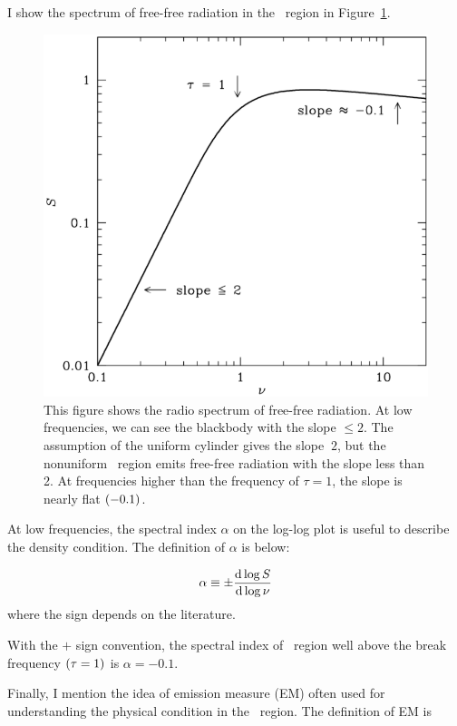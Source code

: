 I show the spectrum of free-free radiation in the \ih~region in Figure~\ref{fig:nrao_radio4n8}.

\begin{figure}[htbp]
	\centering
	\includegraphics[width=.7\linewidth]{Chapter_2/Figures/NRAO_radio4n8.png}
    \caption[The spectrum of free-free radiation]{\label{fig:nrao_radio4n8}
        This figure shows the radio spectrum of free-free radiation.
        At low frequencies, we can see the blackbody with the slope $\leq 2$.
        The assumption of the uniform cylinder gives the slope $~2$, but the nonuniform \ih~region emits free-free radiation with the slope less than 2.
        At frequencies higher than the frequency of $\tau=1$, the slope is nearly flat $\left(-0.1\right)$.
    }
\end{figure}

At low frequencies, the spectral index $\alpha$ on the log-log plot is useful to describe the density condition.
The definition of $\alpha$ is below:

\begin{equation}\label{eq:essential_radio4n55}
    \alpha \equiv \pm \frac{\mathrm{d} \log S}{\mathrm{d} \log \nu}
\end{equation}
where the sign depends on the literature.

With the $+$ sign convention, the spectral index of \ih~region well above the break frequency $\left(\tau=1\right)$ is $\alpha=-0.1$.\\ \vspace{0.2cm}

Finally, I mention the idea of emission measure (EM) often used for understanding the physical condition in the \ih~region.
The definition of EM is

